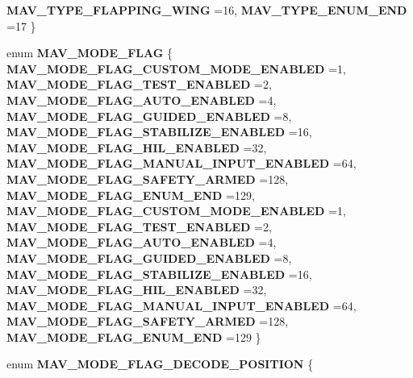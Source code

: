 \begin{DoxyCompactItemize}
\textbf{ M\+A\+V\+\_\+\+T\+Y\+P\+E\+\_\+\+F\+L\+A\+P\+P\+I\+N\+G\+\_\+\+W\+I\+NG} =16, 
\textbf{ M\+A\+V\+\_\+\+T\+Y\+P\+E\+\_\+\+E\+N\+U\+M\+\_\+\+E\+ND} =17
 \}
\item 
enum \textbf{ M\+A\+V\+\_\+\+M\+O\+D\+E\+\_\+\+F\+L\+AG} \{ \newline
\textbf{ M\+A\+V\+\_\+\+M\+O\+D\+E\+\_\+\+F\+L\+A\+G\+\_\+\+C\+U\+S\+T\+O\+M\+\_\+\+M\+O\+D\+E\+\_\+\+E\+N\+A\+B\+L\+ED} =1, 
\textbf{ M\+A\+V\+\_\+\+M\+O\+D\+E\+\_\+\+F\+L\+A\+G\+\_\+\+T\+E\+S\+T\+\_\+\+E\+N\+A\+B\+L\+ED} =2, 
\textbf{ M\+A\+V\+\_\+\+M\+O\+D\+E\+\_\+\+F\+L\+A\+G\+\_\+\+A\+U\+T\+O\+\_\+\+E\+N\+A\+B\+L\+ED} =4, 
\textbf{ M\+A\+V\+\_\+\+M\+O\+D\+E\+\_\+\+F\+L\+A\+G\+\_\+\+G\+U\+I\+D\+E\+D\+\_\+\+E\+N\+A\+B\+L\+ED} =8, 
\newline
\textbf{ M\+A\+V\+\_\+\+M\+O\+D\+E\+\_\+\+F\+L\+A\+G\+\_\+\+S\+T\+A\+B\+I\+L\+I\+Z\+E\+\_\+\+E\+N\+A\+B\+L\+ED} =16, 
\textbf{ M\+A\+V\+\_\+\+M\+O\+D\+E\+\_\+\+F\+L\+A\+G\+\_\+\+H\+I\+L\+\_\+\+E\+N\+A\+B\+L\+ED} =32, 
\textbf{ M\+A\+V\+\_\+\+M\+O\+D\+E\+\_\+\+F\+L\+A\+G\+\_\+\+M\+A\+N\+U\+A\+L\+\_\+\+I\+N\+P\+U\+T\+\_\+\+E\+N\+A\+B\+L\+ED} =64, 
\textbf{ M\+A\+V\+\_\+\+M\+O\+D\+E\+\_\+\+F\+L\+A\+G\+\_\+\+S\+A\+F\+E\+T\+Y\+\_\+\+A\+R\+M\+ED} =128, 
\newline
\textbf{ M\+A\+V\+\_\+\+M\+O\+D\+E\+\_\+\+F\+L\+A\+G\+\_\+\+E\+N\+U\+M\+\_\+\+E\+ND} =129, 
\textbf{ M\+A\+V\+\_\+\+M\+O\+D\+E\+\_\+\+F\+L\+A\+G\+\_\+\+C\+U\+S\+T\+O\+M\+\_\+\+M\+O\+D\+E\+\_\+\+E\+N\+A\+B\+L\+ED} =1, 
\textbf{ M\+A\+V\+\_\+\+M\+O\+D\+E\+\_\+\+F\+L\+A\+G\+\_\+\+T\+E\+S\+T\+\_\+\+E\+N\+A\+B\+L\+ED} =2, 
\textbf{ M\+A\+V\+\_\+\+M\+O\+D\+E\+\_\+\+F\+L\+A\+G\+\_\+\+A\+U\+T\+O\+\_\+\+E\+N\+A\+B\+L\+ED} =4, 
\newline
\textbf{ M\+A\+V\+\_\+\+M\+O\+D\+E\+\_\+\+F\+L\+A\+G\+\_\+\+G\+U\+I\+D\+E\+D\+\_\+\+E\+N\+A\+B\+L\+ED} =8, 
\textbf{ M\+A\+V\+\_\+\+M\+O\+D\+E\+\_\+\+F\+L\+A\+G\+\_\+\+S\+T\+A\+B\+I\+L\+I\+Z\+E\+\_\+\+E\+N\+A\+B\+L\+ED} =16, 
\textbf{ M\+A\+V\+\_\+\+M\+O\+D\+E\+\_\+\+F\+L\+A\+G\+\_\+\+H\+I\+L\+\_\+\+E\+N\+A\+B\+L\+ED} =32, 
\textbf{ M\+A\+V\+\_\+\+M\+O\+D\+E\+\_\+\+F\+L\+A\+G\+\_\+\+M\+A\+N\+U\+A\+L\+\_\+\+I\+N\+P\+U\+T\+\_\+\+E\+N\+A\+B\+L\+ED} =64, 
\newline
\textbf{ M\+A\+V\+\_\+\+M\+O\+D\+E\+\_\+\+F\+L\+A\+G\+\_\+\+S\+A\+F\+E\+T\+Y\+\_\+\+A\+R\+M\+ED} =128, 
\textbf{ M\+A\+V\+\_\+\+M\+O\+D\+E\+\_\+\+F\+L\+A\+G\+\_\+\+E\+N\+U\+M\+\_\+\+E\+ND} =129
 \}
\item 
enum \textbf{ M\+A\+V\+\_\+\+M\+O\+D\+E\+\_\+\+F\+L\+A\+G\+\_\+\+D\+E\+C\+O\+D\+E\+\_\+\+P\+O\+S\+I\+T\+I\+ON} \{ \newline

\end{DoxyCompactItemize}
